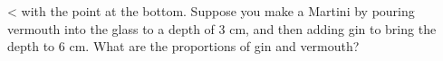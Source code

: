  <%
with the point at the bottom. Suppose you make a Martini by
pouring vermouth into the glass to a depth of 3 cm, and then
adding gin to bring the depth to 6 cm. What are the
proportions of gin and vermouth?
